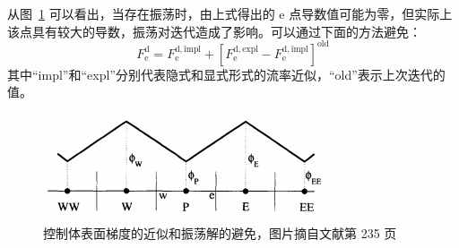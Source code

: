 从图~\ref{fig: approximation} 可以看出，当存在振荡时，由上式得出的 e 点导数值可能为零，但实际上该点具有较大的导数，振荡对迭代造成了影响。可以通过下面的方法避免：%
\begin{equation}
	F_{\mathrm{e}}^{\mathrm{d}} = F_{\mathrm{e}}^{\mathrm{d,impl}} +
	[F_{\mathrm{e}}^{\mathrm{d,expl}} - F_{\mathrm{e}}^{\mathrm{d,impl}}]^{\mathrm{old}}
\end{equation}
其中“impl”和“expl”分别代表隐式和显式形式的流率近似，“old”表示上次迭代的值。

\begin{figure}
	\centering
	\includegraphics[scale=.8]{figs/approximation}
	\caption{控制体表面梯度的近似和振荡解的避免，图片摘自文献第 235 页}
	\label{fig: approximation}
\end{figure}


